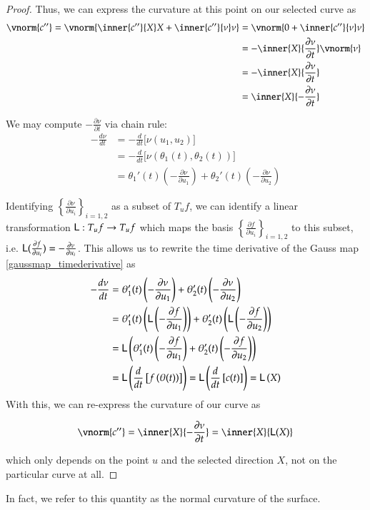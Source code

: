 \begin{proof}
	Thus, we can express the curvature at this point on our selected curve as
	\begin{align}
	\vnorm{c''} = \vnorm{\inner{c''}{X} X + \inner{c''}{\nu}\nu}
	&= \vnorm{0 + \inner{c''}{\nu}\nu} \\
	&= - \inner{X}{\frac{\partial \nu}{\partial t}}\vnorm{\nu} \\
	&= - \inner{X}{\frac{\partial \nu}{\partial t}} \\
	&=  \inner{X}{-\frac{\partial \nu}{\partial t}}
	\end{align}
	
	We may compute $-\frac{\partial \nu}{\partial t}$ via chain rule:
	\begin{align} \label{gaussmap_timederivative}
	-\frac{d \nu}{dt} &= -\frac{d}{dt}\big[\nu(u_1, u_2)\big] \\
	&= -\frac{d}{dt}\big[\nu(\theta_1(t), \theta_2(t))\big] \\
	&= \theta_1'(t)\left( - \frac{\partial \nu}{\partial u_1} \right) + 
	\theta_2'(t)\left( - \frac{\partial \nu}{\partial u_2} \right)
	\end{align}
	
	
	Identifying $\left\{ \frac{\partial \nu}{\partial u_i}\right\}_{i=1,2}$ as a subset of $T_u f$,  we can identify a linear transformation $\mathsf{L}: T_u f \to T_u f$ which maps the basis
	$\left\{ \frac{\partial f}{\partial u_i}\right\}_{i=1,2}$ to this subset, i.e.
	$\mathsf{L}(\frac{\partial f}{\partial u_i}) = - \frac{\partial \nu}{\partial u_i}$. This allows us to rewrite the time derivative of the Gauss map \cref{gaussmap_timederivative} as
		\begin{align}
		-\frac{d \nu}{dt} &= 
		\theta_1'(t)\left( - \frac{\partial \nu}{\partial u_1} \right) + 
		\theta_2'(t)\left( - \frac{\partial \nu}{\partial u_2} \right) \\
		&= \theta_1'(t)\left( \mathsf{L}\left(- \frac{\partial f}{\partial u_1}\right) \right) + 
		\theta_2'(t)\left( \mathsf{L}\left(- \frac{\partial f}{\partial u_2}\right) \right) \\
		&= \mathsf{L}\left(\theta_1'(t)\left( - \frac{\partial f}{\partial u_1}\right)  + 
		\theta_2'(t)\left( - \frac{\partial f}{\partial u_2} \right)\right) \\
		&= \mathsf{L}\left( \frac{d}{dt}\left[ f\left(\theta(t)\right)\right] \right)
		= \mathsf{L}\left( \frac{d}{dt} \left[ c(t) \right] \right) = \mathsf{L}\left(X\right)
		\end{align} 
		With this, we can re-express the curvature of our curve as
		
		\begin{equation}
		\vnorm{c''} = \inner{X}{-\frac{\partial \nu}{\partial t}} = \inner{X}{\wein(X)}
		\end{equation}
		
		which only depends on the point $u$ and the selected direction $X$, not on the particular curve at all.
	\end{proof}
	In fact, we refer to this quantity as the normal curvature of the surface. 
	
